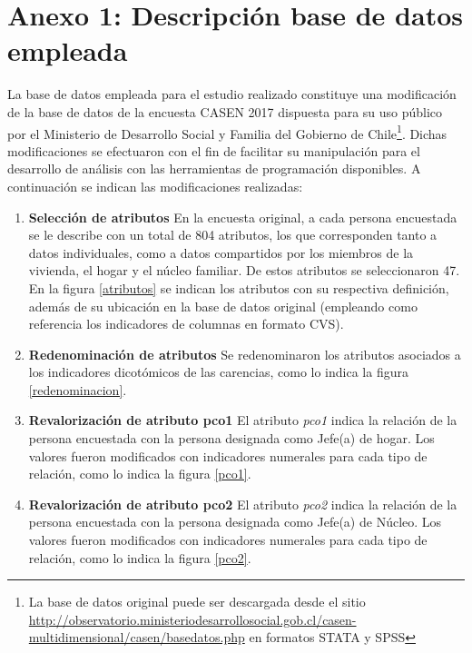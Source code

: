 \documentclass[12pt,letterpaper,spanish]{article}
\begin{document}
\section*{\centering Anexo 1: Descripción base de datos empleada}\label{descripcion_base_datos}

La base de datos empleada para el estudio realizado constituye una modificación de la base de datos de la encuesta CASEN 2017 dispuesta para su uso público por el Ministerio de Desarrollo Social y Familia del Gobierno de Chile\footnote{La base de datos original puede ser descargada desde el sitio \url{http://observatorio.ministeriodesarrollosocial.gob.cl/casen-multidimensional/casen/basedatos.php} en formatos STATA y SPSS}. Dichas modificaciones se efectuaron con el fin de facilitar su manipulación para el desarrollo de análisis con las herramientas de programación disponibles. A continuación se indican las modificaciones realizadas:

\begin{enumerate}
    \item \textbf{Selección de atributos}
    En la encuesta original, a cada persona encuestada se le describe con un total de 804 atributos, los que corresponden tanto a datos individuales, como a datos compartidos por los miembros de la vivienda, el hogar y el núcleo familiar. De estos atributos se seleccionaron 47. En la figura \ref{atributos} se indican los atributos con su respectiva definición, además de su ubicación en la base de datos original (empleando como referencia los indicadores de columnas en formato CVS). 
    
    \item \textbf{Redenominación de atributos}
    Se redenominaron los atributos asociados a los indicadores dicotómicos de las carencias, como lo indica la figura \ref{redenominacion}.
    
    \item \textbf{Revalorización de atributo pco1}
    El atributo \textit{pco1} indica la relación de la persona encuestada con la persona designada como Jefe(a) de hogar. Los valores fueron modificados con indicadores numerales para cada tipo de relación, como lo indica la figura \ref{pco1}.
    
    \item \textbf{Revalorización de atributo pco2}
    El atributo \textit{pco2} indica la relación de la persona encuestada con la persona designada como Jefe(a) de Núcleo. Los valores fueron modificados con indicadores numerales para cada tipo de relación, como lo indica la figura \ref{pco2}.
    
\end{enumerate}
\end{document}
